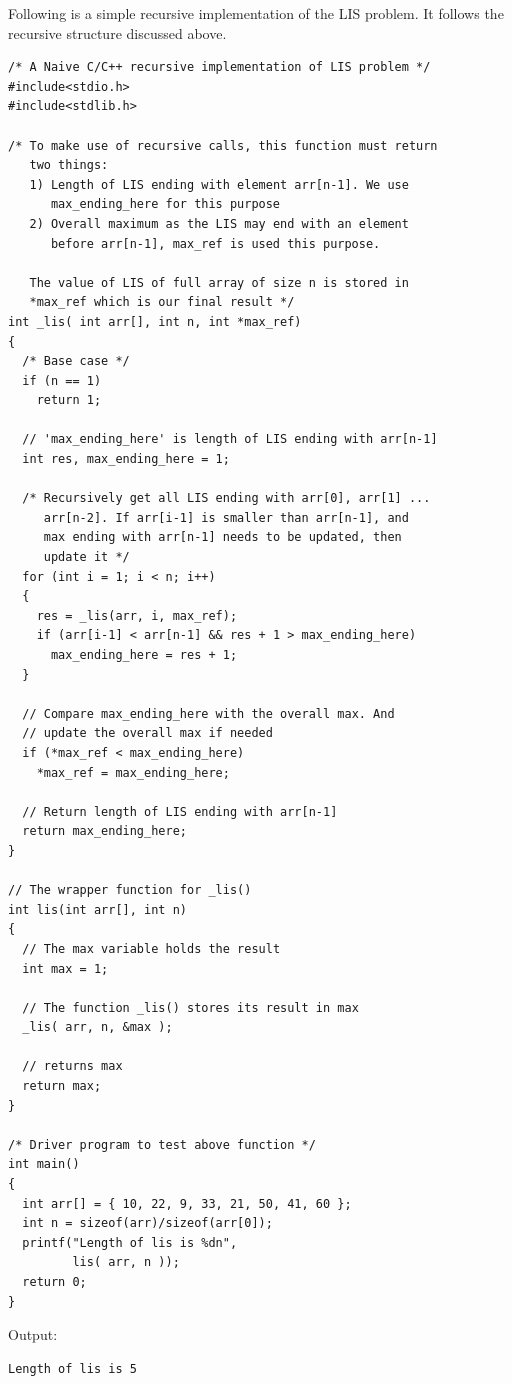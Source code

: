 Following is a simple recursive implementation of the LIS problem. It
follows the recursive structure discussed above.
\begin{lstlisting}[style=raycppnewsnippet]
/* A Naive C/C++ recursive implementation of LIS problem */
#include<stdio.h>
#include<stdlib.h>
 
/* To make use of recursive calls, this function must return
   two things:
   1) Length of LIS ending with element arr[n-1]. We use
      max_ending_here for this purpose
   2) Overall maximum as the LIS may end with an element
      before arr[n-1], max_ref is used this purpose.

   The value of LIS of full array of size n is stored in
   *max_ref which is our final result */
int _lis( int arr[], int n, int *max_ref)
{
  /* Base case */
  if (n == 1)
    return 1;
 
  // 'max_ending_here' is length of LIS ending with arr[n-1]
  int res, max_ending_here = 1; 
 
  /* Recursively get all LIS ending with arr[0], arr[1] ...
     arr[n-2]. If arr[i-1] is smaller than arr[n-1], and
     max ending with arr[n-1] needs to be updated, then
     update it */
  for (int i = 1; i < n; i++)
  {
    res = _lis(arr, i, max_ref);
    if (arr[i-1] < arr[n-1] && res + 1 > max_ending_here)
      max_ending_here = res + 1;
  }
 
  // Compare max_ending_here with the overall max. And
  // update the overall max if needed
  if (*max_ref < max_ending_here)
    *max_ref = max_ending_here;
 
  // Return length of LIS ending with arr[n-1]
  return max_ending_here;
}

// The wrapper function for _lis()
int lis(int arr[], int n)
{
  // The max variable holds the result
  int max = 1;
 
  // The function _lis() stores its result in max
  _lis( arr, n, &max );
 
  // returns max
  return max;
}
 
/* Driver program to test above function */
int main()
{
  int arr[] = { 10, 22, 9, 33, 21, 50, 41, 60 };
  int n = sizeof(arr)/sizeof(arr[0]);
  printf("Length of lis is %dn",
         lis( arr, n ));
  return 0;
}
\end{lstlisting}
Output:
\begin{lstlisting}[style=rayio]
Length of lis is 5
\end{lstlisting}


